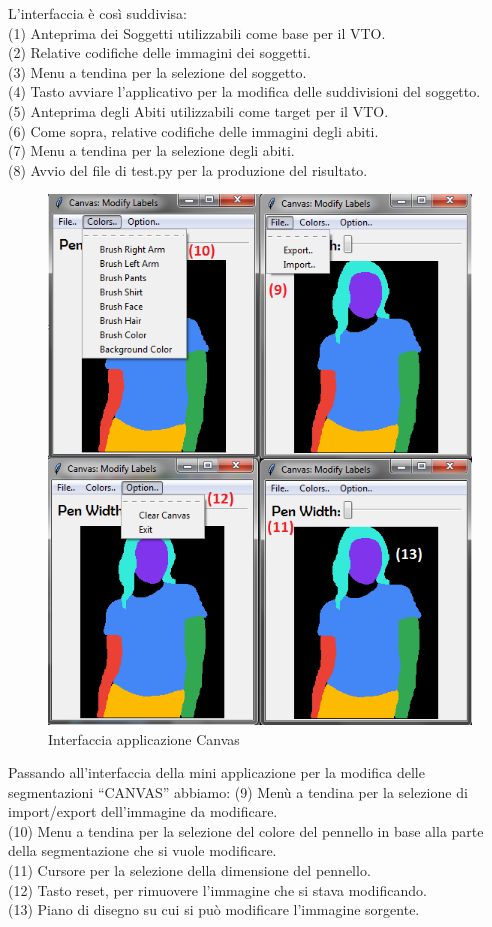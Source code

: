 \documentclass[final, 11pt]{article}
\begin{document}
L’interfaccia è così suddivisa:\\
	(1) Anteprima dei Soggetti utilizzabili come base per il VTO.
\\
	(2) Relative codifiche delle immagini dei soggetti.
\\
	(3) Menu a tendina per la selezione del soggetto. 
\\
	(4) Tasto avviare l’applicativo per la modifica delle suddivisioni del soggetto. 
\\
	(5) Anteprima degli Abiti utilizzabili come target per il VTO. 
\\
	(6) Come sopra, relative codifiche delle immagini degli abiti. \\
	(7) Menu a tendina per la selezione degli abiti.
\\
	(8) Avvio del file di test.py per la produzione del risultato. 
\\
	
	\begin{figure}[!htb]
		\centering
		\includegraphics[width=0.5\linewidth]{PyTryOn_numerata_2.png}
		\caption{Interfaccia applicazione Canvas}
	\end{figure} 
	Passando all’interfaccia della mini applicazione per la modifica delle segmentazioni “CANVAS” abbiamo:
\newline
	(9) Menù a tendina per la selezione di import/export dell’immagine da modificare. \\
	(10) Menu a tendina per la selezione del colore del pennello in base alla parte della segmentazione che si vuole modificare. 
\\
	(11) Cursore per la selezione della dimensione del pennello. 
\\
	(12) Tasto reset, per rimuovere l’immagine che si stava modificando. \\
	(13) Piano di disegno su cui si può modificare l’immagine sorgente.
\\
	
\end{document}
